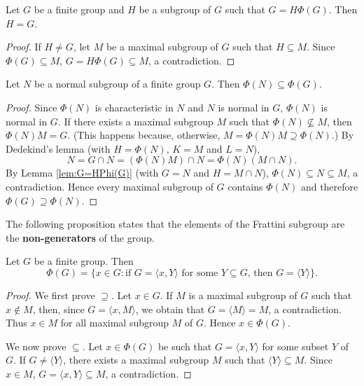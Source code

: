 \begin{lemma}
\label{lem:G=HPhi(G)}
Let $G$ be a finite group and $H$ be a subgroup of $G$ such that 
$G=H\Phi(G)$. Then $H=G$.
\end{lemma}

\begin{proof}
If $H\ne G$, let $M$ be a maximal subgroup of $G$ such that 
$H\subseteq M$. Since $\Phi(G)\subseteq M$, $G=H\Phi(G)\subseteq M$, a 
contradiction. 
\end{proof}

\begin{proposition}
\label{pro:phi(N)phi(G)}
Let $N$ be a normal subgroup of a finite group $G$. Then 
$\Phi(N)\subseteq\Phi(G)$.
\end{proposition}

\begin{proof}
Since $\Phi(N)$ is characteristic in $N$ and $N$ 
is normal in $G$, $\Phi(N)$ is normal in $G$. 
If there exists a maximal subgroup $M$ such that 
$\Phi(N)\not\subseteq M$, then $\Phi(N)M=G$. (This happens
because, otherwise, $M=\Phi(N)M\supseteq\Phi(N)$.) By Dedekind's lemma (with  $H=\Phi(N)$, $K=M$ and $L=N$), 
\[
N=G\cap N=(\Phi(N)M)\cap N=\Phi(N)(M\cap N).
\]
By Lemma \ref{lem:G=HPhi(G)} (with $G=N$ and $H=M\cap N$), 
$\Phi(N)\subseteq N\subseteq M$, a contradiction. 
Hence every maximal subgroup of $G$ contains $\Phi(N)$ and therefore 
$\Phi(G)\supseteq\Phi(N)$. 
\end{proof}

The following proposition states that the 
elements of the Frattini subgroup are the \textbf{non-generators} of 
the group. 

\begin{proposition}
	\label{pro:nongenerators}
	Let $G$ be a finite group. Then 
 	\[
	\Phi(G)=\{x\in G:\text{if $G=\langle x,Y\rangle$ for some $Y\subseteq G$, then $G=\langle Y\rangle$}\}.
	\]
\end{proposition}

\begin{proof}
We first prove $\supseteq$. Let $x\in G$. If $M$ is a maximal subgroup of $G$ such that $x\not\in M$, then, since $G=\langle
	x,M\rangle$, we obtain that $G=\langle M\rangle=M$, a contradiction. Thus $x\in M$ for all maximal subgroup $M$ of $G$. Hence 
 $x\in \Phi(G)$. 

We now prove $\subseteq$. Let $x\in\Phi(G)$ be such that $G=\langle
	x,Y\rangle$ for some subset $Y$ of $G$. If $G\ne \langle Y\rangle$,
	there exists a maximal subgroup $M$ such that $\langle Y\rangle\subseteq M$. Since
	$x\in M$, $G=\langle x,Y\rangle\subseteq M$, a contradiction. 
\end{proof}

